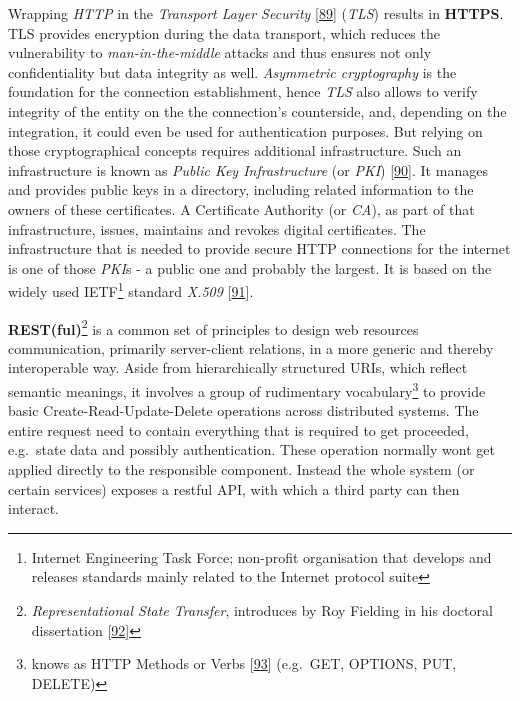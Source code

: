 \documentclass[12pt,english,a4paper,titlepage,cleardoublepage=empty,dottedtoc]{report}
\begin{document}
Wrapping \emph{HTTP} in the \emph{Transport Layer Security}
{[}\protect\hyperlink{ref-web_spec_tls}{89}{]} (\emph{TLS}) results in
\textbf{HTTPS}. TLS provides encryption during the data transport, which
reduces the vulnerability to \emph{man-in-the-middle} attacks and thus
ensures not only confidentiality but data integrity as well.
\emph{Asymmetric cryptography} is the foundation for the connection
establishment, hence \emph{TLS} also allows to verify integrity of the
entity on the the connection's counterside, and, depending on the
integration, it could even be used for authentication purposes. But
relying on those cryptographical concepts requires additional
infrastructure. Such an infrastructure is known as \emph{Public Key
Infrastructure} (or \emph{PKI})
{[}\protect\hyperlink{ref-book_2014_chapter-14-5-pki}{90}{]}. It manages
and provides public keys in a directory, including related information
to the owners of these certificates. A Certificate Authority (or
\emph{CA}), as part of that infrastructure, issues, maintains and
revokes digital certificates. The infrastructure that is needed to
provide secure HTTP connections for the internet is one of those
\emph{PKI}s - a public one and probably the largest. It is based on the
widely used IETF\footnote{Internet Engineering Task Force; non-profit
  organisation that develops and releases standards mainly related to
  the Internet protocol suite} standard \emph{X.509}
{[}\protect\hyperlink{ref-web_spec_x509}{91}{]}.

\textbf{REST(ful)}\footnote{\emph{Representational State Transfer},
  introduces by Roy Fielding in his doctoral dissertation
  {[}\protect\hyperlink{ref-web_spec_rest}{92}{]}} is a common set of
principles to design web resources communication, primarily
server-client relations, in a more generic and thereby interoperable
way. Aside from hierarchically structured URIs, which reflect semantic
meanings, it involves a group of rudimentary vocabulary\footnote{knows
  as HTTP Methods or Verbs
  {[}\protect\hyperlink{ref-web_spec_http-methods}{93}{]} (e.g.~GET,
  OPTIONS, PUT, DELETE)} to provide basic Create-Read-Update-Delete
operations across distributed systems. The entire request need to
contain everything that is required to get proceeded, e.g.~state data
and possibly authentication. These operation normally wont get applied
directly to the responsible component. Instead the whole system (or
certain services) exposes a restful API, with which a third party can
then interact.
\end{document}
